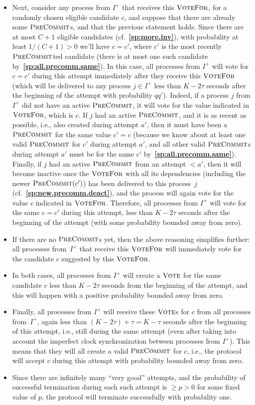 \documentclass[12pt,oneside]{article}
\def\refpoint#1{{\rm\textbf{\ref{#1}}}}
\let\ptref=\refpoint
\def\opsc#1{\operatorname{\textsc{#1}}}
\def\PreCommit{\opsc{PreCommit}}
\def\Vote{\opsc{Vote}}
\def\VoteFor{\opsc{VoteFor}}
\begin{document}
\begin{itemize}
\item Next, consider any process from $I^+$ that receives this $\VoteFor$, for a randomly chosen eligible candidate $c$, and suppose that there are already some $\PreCommit$s, and that the previous statement holds. Since there are at most $C+1$ eligible candidates (cf.~\ptref{sp:more.inv}), with probability at least $1/(C+1)>0$ we'll have $c=c'$, where $c'$ is the most recently $\PreCommit$ted candidate (there is at most one such candidate by~\ptref{sp:all.precomm.same}). In this case, all processes from $I^+$ will vote for $c=c'$ during this attempt immediately after they receive this $\VoteFor$ (which will be delivered to any process $j\in I^+$ less than $K-2\tau$ seconds after the beginning of the attempt with probability $qq'$). Indeed, if a process $j$ from $I^+$ did not have an active $\PreCommit$, it will vote for the value indicated in $\VoteFor$, which is $c$. If $j$ had an active $\PreCommit$, and it is as recent as possible, i.e., also created during attempt $a'$, then it must have been a $\PreCommit$ for the same value $c'=c$ (because we know about at least one valid $\PreCommit$ for $c'$ during attempt $a'$, and all other valid $\PreCommit$s during attempt $a'$ must be for the same $c'$ by~\ptref{sp:all.precomm.same}). Finally, if $j$ had an active $\PreCommit$ from an attempt $<a'$, then it will become inactive once the $\VoteFor$ with all its dependencies (including the newer $\PreCommit(c')$) has been delivered to this process~$j$ (cf.~\ptref{sp:new.precomm.deact}), and the process will again vote for the value $c$ indicated in $\VoteFor$. Therefore, all processes from $I^+$ will vote for the same $c=c'$ during this attempt, less than $K-2\tau$ seconds after the beginning of the attempt (with some probability bounded away from zero).
\item If there are no $\PreCommit$s yet, then the above reasoning simplifies further: all processes from~$I^+$ that receive this $\VoteFor$ will immediately vote for the candidate $c$ suggested by this $\VoteFor$.
\item In both cases, all processes from $I^+$ will create a $\Vote$ for the same candidate $c$ less than $K-2\tau$ seconds from the beginning of the attempt, and this will happen with a positive probability bounded away from zero.
\item Finally, all processes from $I^+$ will receive these $\Vote$s for $c$ from all processes from~$I^+$, again less than $(K-2\tau)+\tau=K-\tau$ seconds after the beginning of this attempt, i.e., still during the same attempt (even after taking into account the imperfect clock synchronization between processes from $I^+$). This means that they will all create a valid $\PreCommit$ for $c$, i.e., the protocol will accept $c$ during this attempt with probability bounded away from zero.
\item Since there are infinitely many ``very good'' attempts, and the probability of successful termination during each such attempt is $\geq p>0$ for some fixed value of $p$, the protocol will terminate successfully with probability one.
\end{itemize}
\end{document}
